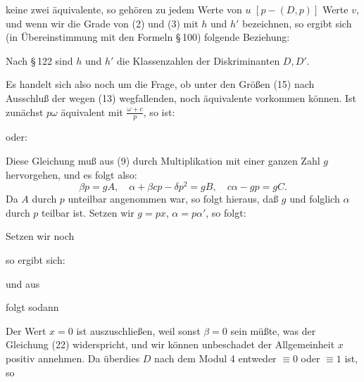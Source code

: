 keine zwei äquivalente, so gehören zu jedem Werte von $u$ $[p-(D,p)]$ Werte $v$, und wenn wir die Grade von (2) und (3) mit $h$ und $h'$ bezeichnen, so ergibt sich (in Übereinstimmung mit den Formeln \S\,100) folgende Beziehung:


Nach \S\,122 sind $h$ und $h'$ die Klassenzahlen der Diskriminanten $D, D'$.

Es handelt sich also noch um die Frage, ob unter den Größen (15) nach Ausschluß der wegen (13) wegfallenden, noch äquivalente vorkommen können. Ist zunächst $p\omega$ äquivalent mit $\frac{\omega+c}{p}$, so ist:


oder:


Diese Gleichung muß aus (9) durch Multiplikation mit einer ganzen Zahl $g$ hervorgehen, und es folgt also:
\[
\beta p = gA, \quad \alpha+\beta c p-\delta p^2 = gB, \quad c\alpha - gp = gC. %
\]
Da $A$ durch $p$ unteilbar angenommen war, so folgt hieraus, daß $g$ und folglich $\alpha$ durch $p$ teilbar ist. Setzen wir $g=px$, $\alpha=p\alpha'$, so folgt:


Setzen wir noch


so ergibt sich:


und aus


folgt sodann


Der Wert $x=0$ ist auszuschließen, weil sonst $\beta=0$ sein müßte, was der Gleichung (22) widerspricht, und wir können unbeschadet der Allgemeinheit $x$ positiv annehmen. Da überdies $D$ nach dem Modul 4 entweder $\equiv 0$ oder $\equiv 1$ ist, so
